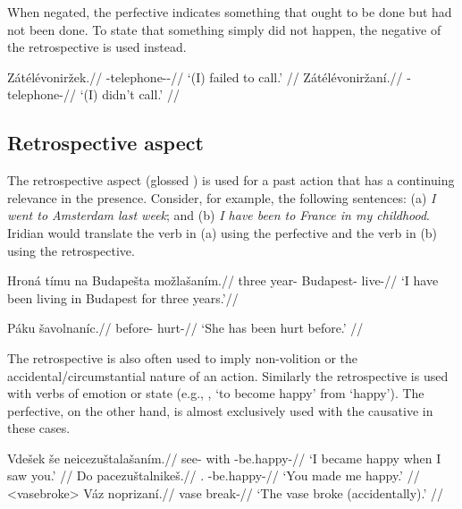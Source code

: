 When negated, the perfective indicates something that ought to be done but had not been done. To state that something simply did not happen, the negative of the retrospective is used instead.

\begin{multicols}{2}
\pex
\a\begingl
\gla Zátélévoniržek.//
\glb \Neg{}-telephone-\Av{}-\Pf{}//
\glft `(I) failed to call.' //
\endgl
\a\begingl
\gla Zátélévoniržaní.//
\glb \Neg{}-telephone-//
\glft `(I) didn't call.' //
\endgl
\xe
\end{multicols}

\subsection{Retrospective aspect}
\par The retrospective aspect (glossed ) is used for a past action that has a continuing relevance in the presence. Consider, for example, the following sentences: (a) \textit{I went to Amsterdam last week}; and (b) \textit{I have been to France in my childhood}. Iridian would translate the verb in (a) using the perfective and the verb in (b) using the retrospective.

\begingl
\gla Hroná tímu na Budapešta možlašaním.//
\glb three year-\Ins{} \Loc{} Budapest-\Acc{} live-//
\glft `I have been living in Budapest for three years.'//
\endgl
\xe

\begingl
\gla Páku šavolnaníc.//
\glb before-\Ins{} hurt-//
\glft `She has been hurt before.' //
\endgl
\xe

\par The retrospective is also often used to imply non-volition or the  accidental/circumstantial nature of an action. Similarly the retrospective is used with verbs of emotion or state (e.g., , ‘to become happy’ from  ‘happy’). The perfective, on the other hand, is almost exclusively used with the causative in these cases.

\pex
\a	\begingl
\gla Vdešek še neicezuštalašaním.//
\glb see- with -be.happy-//
\glft `I became happy when I saw you.' //
\endgl
\a	\begingl
\gla Do pacezuštalnikeš.//
\glb \First{}\Sg{}.\Wk{} \Caus{}-be.happy-//
\glft `You made me happy.' //
\endgl
\xe
\pex<vasebroke>
\begingl
\gla Váz noprizaní.//
\glb vase break-//
\glft `The vase broke (accidentally).' //
\endgl
\xe


